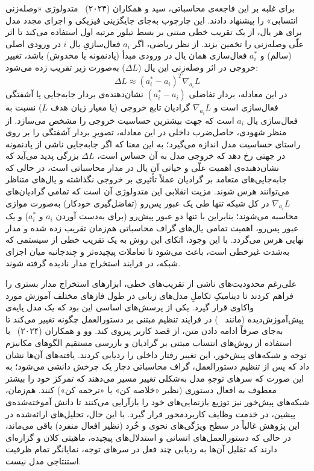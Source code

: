 برای غلبه بر این فاجعه‌ی محاسباتی، سید و همکاران (۲۰۲۴)~\cite{syed2024attribution} متدولوژی «وصله‌زنی انتسابی» را پیشنهاد دادند. این چارچوب به‌جای جایگزینی فیزیکی و اجرای مجدد مدل برای هر یال، از یک تقریب خطی مبتنی بر بسط تیلور مرتبه اول استفاده می‌کند تا اثر علّی وصله‌زنی را تخمین بزند. از نظر ریاضی، اگر $a_i$ فعال‌سازیِ یال $i$ در ورودی اصلی (سالم) و $a_i^*$ فعال‌سازی همان یال در ورودی مبدأ (پادنمونه یا مخدوش) باشد، تغییر خروجی در اثر وصله‌زنی این یال ($\Delta L$) به‌صورت زیر تقریب زده می‌شود:
\begin{equation}\label{eq:chap3_attribution_patching}
    \Delta L \approx {\left( a_i^* - a_i \right)}^T \nabla_{a_i} L
\end{equation}
در این معادله، بردار تفاضلی $(a_i^* - a_i)$ نشان‌دهنده‌ی بردار جابه‌جایی یا آشفتگی فعال‌سازی است و $\nabla_{a_i} L$ گرادیان تابع خروجی (یا معیار زیان هدف $L$) نسبت به فعال‌سازی یال $a_i$ است که جهت بیشترین حساسیت خروجی را مشخص می‌سازد. از منظر شهودی، حاصل‌ضرب داخلی در این معادله، تصویرِ بردار آشفتگی را بر روی راستای حساسیت مدل اندازه می‌گیرد؛ به این معنا که اگر جابه‌جایی ناشی از پادنمونه در جهتی رخ دهد که خروجی مدل به آن حساس است، $\Delta L$ بزرگی پدید می‌آید که نشان‌دهنده‌ی اهمیت علّی و حیاتی آن یال در مدار محاسباتی است، در حالی که جابه‌جایی‌های متعامد بر گرادیان عملاً تأثیری بر خروجی نگذاشته و یال‌های متناظر می‌توانند هرس شوند. مزیت انقلابی این متدولوژی آن است که تمامی گرادیان‌های $\nabla_{a_i} L$ در کل شبکه تنها طی یک عبور پس‌رو (تفاضل‌گیری خودکار) به‌صورت موازی محاسبه می‌شوند؛ بنابراین با تنها دو عبور پیش‌رو (برای به‌دست آوردن $a_i$ و $a_i^*$) و یک عبور پس‌رو، اهمیت تمامی یال‌های گراف محاسباتی هم‌زمان تقریب زده شده و مدار نهایی هرس می‌گردد. با این وجود، اتکای این روش به یک تقریب خطی از سیستمی که به‌شدت غیرخطی است، باعث می‌شود تا تعاملات پیچیده‌تر و چندجانبه میان اجزای شبکه، در فرایند استخراج مدار نادیده گرفته شوند.

علی‌رغم محدودیت‌های ناشی از تقریب‌های خطی، ابزارهای استخراج مدار بستری را فراهم کردند تا دینامیکِ تکاملِ مدل‌های زبانی در طول فازهای مختلف آموزش مورد واکاوی قرار گیرد. یکی از پرسش‌های اساسی این بود که یک مدل پایه‌ی پیش‌آموزش‌دیده (مانند ~\cite{touvron2023llama}) در فرایند تنظیم مبتنی بر دستورالعمل چگونه تغییر می‌کند تا به‌جای صرفاً ادامه دادن متن، از قصد کاربر پیروی کند. وو و همکاران (۲۰۲۴)~\cite{wu2024language} با استفاده از روش‌های انتساب مبتنی بر گرادیان و بازرسی مستقیم الگوهای مکانیزم توجه و شبکه‌های پیش‌خور، این تغییر رفتار داخلی را ردیابی کردند. یافته‌های آن‌ها نشان داد که پس از تنظیم دستورالعمل، گراف محاسباتی دچار یک چرخش دانشی می‌شود؛ به این صورت که سرهای توجهِ مدل به‌شکلی تغییر مسیر می‌دهند که تمرکز خود را بیشتر معطوف به افعال دستوری (نظیر «خلاصه کن» یا «ترجمه کن») کنند. هم‌زمان، شبکه‌های پیش‌خور نیز توزیع بازنمایی‌های خود را بازآرایی می‌کنند تا دانش آموخته‌شده‌ی پیشین، در خدمت وظایف کاربردمحور قرار گیرد. با این حال، تحلیل‌های ارائه‌شده در این پژوهش غالباً در سطح ویژگی‌های نحوی و خُرد (نظیر افعال منفرد) باقی می‌ماند، در حالی که دستورالعمل‌های انسانی و استدلال‌های پیچیده، ماهیتی کلان و گزاره‌ای دارند که تقلیل آن‌ها به ردیابی چند فعل در سرهای توجه، نمایانگر تمام ظرفیت استنتاجی مدل نیست.

